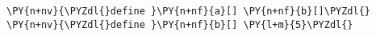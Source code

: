 \begin{Verbatim}[commandchars=\\\{\}]
\PY{n+nv}{\PYZdl{}define }\PY{n+nf}{a}[] \PY{n+nf}{b}[]\PYZdl{}
\PY{n+nv}{\PYZdl{}define }\PY{n+nf}{b}[] \PY{l+m}{5}\PYZdl{}
\end{Verbatim}
